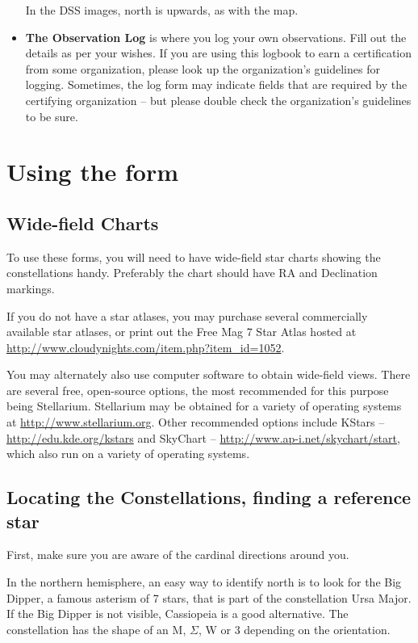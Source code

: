 \begin{itemize}
  In the DSS images, north is upwards, as with the map.

\item \textbf{The Observation Log} is where you log your own
  observations. Fill out the details as per your wishes. If you are
  using this logbook to earn a certification from some organization,
  please look up the organization's guidelines for logging. Sometimes,
  the log form may indicate fields that are required by the certifying
  organization -- but please double check the organization's
  guidelines to be sure.

\end{itemize}

\section{Using the form}

\subsection{Wide-field Charts}
To use these forms, you will need to have wide-field star charts
showing the constellations handy. Preferably the chart should have RA
and Declination markings.

If you do not have a star atlases, you may purchase several
commercially available star atlases, or print out the Free Mag 7 Star
Atlas hosted at
\url{http://www.cloudynights.com/item.php?item_id=1052}.

You may alternately also use computer software to obtain wide-field
views. There are several free, open-source options, the most
recommended for this purpose being Stellarium. Stellarium may be
obtained for a variety of operating systems at
\url{http://www.stellarium.org}. Other recommended options include
KStars -- \url{http://edu.kde.org/kstars} and SkyChart --
\url{http://www.ap-i.net/skychart/start}, which also run on a variety
of operating systems.

\subsection{Locating the Constellations, finding a reference star}
First, make sure you are aware of the cardinal directions around
you. 

In the northern hemisphere, an easy way to identify north is to look
for the Big Dipper, a famous asterism of 7 stars, that is part of the
constellation Ursa Major. If the Big Dipper is not visible, Cassiopeia
is a good alternative. The constellation has the shape of an M,
$\Sigma$, W or 3 depending on the orientation.

